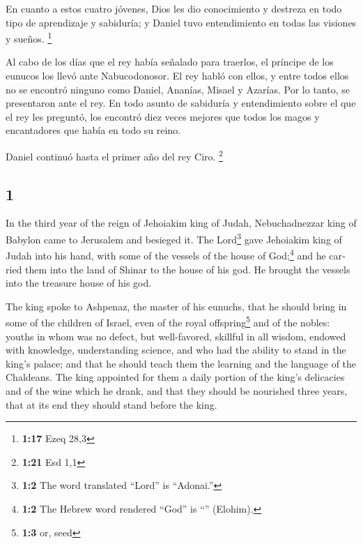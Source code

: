 \begin{paracol}{2}
 En cuanto a estos cuatro jóvenes, Dios les dio
conocimiento y destreza en todo tipo de aprendizaje y sabiduría; y
Daniel tuvo entendimiento en todas las visiones y sueños. \footnote{\textbf{1:17}
  Ezeq 28,3}

 Al cabo de los días que el rey había señalado para
traerlos, el príncipe de los eunucos los llevó ante Nabucodonosor.
 El rey habló con ellos, y entre todos ellos no se
encontró ninguno como Daniel, Ananías, Misael y Azarías. Por lo tanto,
se presentaron ante el rey.  En todo asunto de sabiduría
y entendimiento sobre el que el rey les preguntó, los encontró diez
veces mejores que todos los magos y encantadores que había en todo su
reino.

 Daniel continuó hasta el primer año del rey Ciro.
\footnote{\textbf{1:21} Esd 1,1}

\switchcolumn
\begin{otherlanguage}{english}

\hypertarget{section-1}{%
\section{1}\label{section-1}}

 In the third year of the reign of Jehoiakim king of
Judah, Nebuchadnezzar king of Babylon came to Jerusalem and besieged it.
 The Lord\footnote{\textbf{1:2} The word translated
  ``Lord'' is ``Adonai.''} gave Jehoiakim king of Judah into his hand,
with some of the vessels of the house of God;\footnote{\textbf{1:2} The
  Hebrew word rendered ``God'' is ``'' (Elohim).} and he
carried them into the land of Shinar to the house of his god. He brought
the vessels into the treasure house of his god.

 The king spoke to Ashpenaz, the master of his eunuchs,
that he should bring in some of the children of Israel, even of the
royal offspring\footnote{\textbf{1:3} or, seed} and of the nobles:
 youths in whom was no defect, but well-favored, skillful
in all wisdom, endowed with knowledge, understanding science, and who
had the ability to stand in the king's palace; and that he should teach
them the learning and the language of the Chaldeans.  The
king appointed for them a daily portion of the king's delicacies and of
the wine which he drank, and that they should be nourished three years,
that at its end they should stand before the king.


\end{otherlanguage}
\end{paracol}
